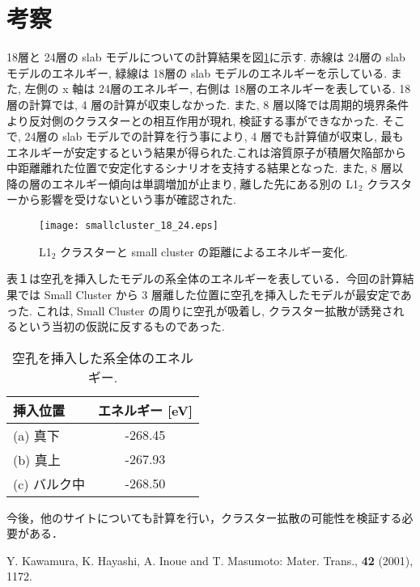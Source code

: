 \documentclass[a4j,twocolumn]{jsarticle}
\begin{document}
\section{考察}
\vspace{-0.5em}

18層と 24層の slab モデルについての計算結果を図\ref{fig4.1}に示す. 赤線は 24層の slab モデルのエネルギー, 緑線は 18層の slab モデルのエネルギーを示している. また, 左側の x 軸は 24層のエネルギー, 右側は 18層のエネルギーを表している. 18 層の計算では, 4 層の計算が収束しなかった. また, 8 層以降では周期的境界条件より反対側のクラスターとの相互作用が現れ, 検証する事ができなかった. そこで, 24層の slab モデルでの計算を行う事により, 4 層でも計算値が収束し, 最もエネルギーが安定するという結果が得られた.これは溶質原子が積層欠陥部から中距離離れた位置で安定化するシナリオを支持する結果となった. また, 8 層以降の層のエネルギー傾向は単調増加が止まり, 離した先にある別の L1$_2$ クラスターから影響を受けないという事が確認された.


\begin{figure}[htbp]
\begin{center}
\texttt{[image: smallcluster\_18\_24.eps]}
\caption{L1$_2$ クラスターと small cluster の距離によるエネルギー変化.}
\label{fig4.1}
\end{center}
    \vspace{-2em}
\end{figure}

表１は空孔を挿入したモデルの系全体のエネルギーを表している．今回の計算結果では Small Cluster から 3 層離した位置に空孔を挿入したモデルが最安定であった. これは, Small Cluster の周りに空孔が吸着し, クラスター拡散が誘発されるという当初の仮説に反するものであった. 

\begin{table}[htb]
\caption{空孔を挿入した系全体のエネルギー.}
  \begin{center}
  \small
    \begin{tabular}{lc} \hline
 挿入位置 & エネルギー [eV] \\ \hline
   (a) 真下 & -268.45\\
   (b) 真上 & -267.93\\
   (c) バルク中 & -268.50\\
\hline
    \end{tabular}
  \end{center}
  \vspace{-0.5em}
\end{table}

今後，他のサイトについても計算を行い，クラスター拡散の可能性を検証する必要がある．

\begin{thebibliography}{9}
Y. Kawamura, K. Hayashi, A. Inoue and T. Masumoto: Mater. Trans., {\bf 42} (2001), 1172.

\end{thebibliography}
\end{document}
